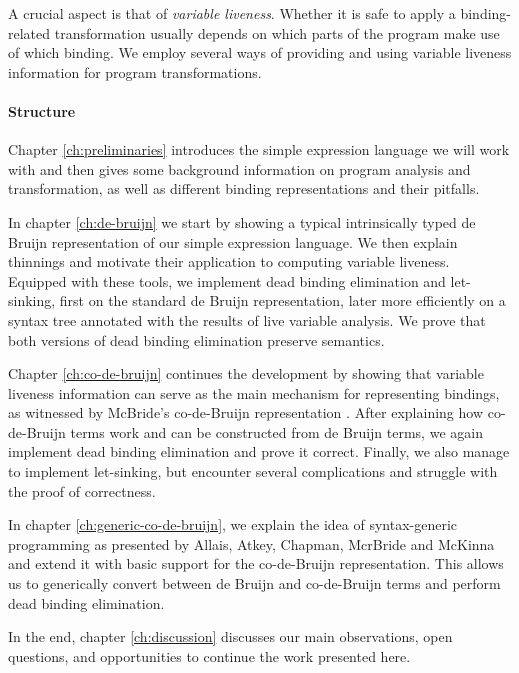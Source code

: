     A crucial aspect is that of \emph{variable liveness}.
    Whether it is safe to apply a binding-related transformation
    usually depends on which parts of the program make use of which binding.
    We employ several ways of providing and using variable liveness information
    for program transformations.

  \paragraph{Structure}
    Chapter \ref{ch:preliminaries}
    introduces the simple expression language we will work with
    and then gives some background information on program analysis and transformation,
    as well as different binding representations and their pitfalls.

    In chapter \ref{ch:de-bruijn} we start by
    showing a typical intrinsically typed de Bruijn representation of our simple expression language.
    We then explain thinnings and motivate their application to computing variable liveness.
    Equipped with these tools,
    we implement dead binding elimination and let-sinking,
    first on the standard de Bruijn representation,
    later more efficiently on a syntax tree annotated with the results of live variable analysis.
    We prove that both versions of dead binding elimination preserve semantics.

    Chapter \ref{ch:co-de-bruijn} continues the development by showing that variable liveness information
    can serve as the main mechanism for representing bindings, as witnessed by
    McBride's co-de-Bruijn representation
    \cite{McBride2018EveryBodysGotToBeSomewhere}.
    After explaining how co-de-Bruijn terms work and can be constructed from de Bruijn terms,
    we again implement dead binding elimination and prove it correct.
    Finally, we also manage to implement let-sinking, but encounter several complications
    and struggle with the proof of correctness.

    In chapter \ref{ch:generic-co-de-bruijn}, we explain the idea of syntax-generic programming
    as presented by Allais, Atkey, Chapman, McrBride and McKinna
    \cite{Allais2018UniverseOfSyntaxes}
    and extend it with basic support for the co-de-Bruijn representation.
    This allows us to generically convert between de Bruijn and co-de-Bruijn terms
    and perform dead binding elimination.

    In the end, chapter \ref{ch:discussion} discusses our main observations,
    open questions, and opportunities to continue the work presented here.

